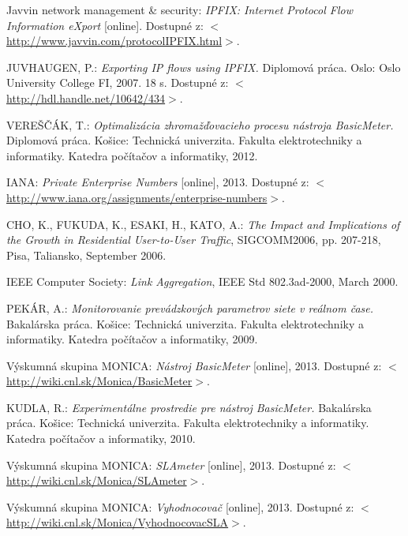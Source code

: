 \begin{thebibliography}{999}
Javvin network management \& security: \emph{IPFIX: Internet Protocol Flow Information eXport} [online]. Dostupné 
z: $<$\url{http://www.javvin.com/protocolIPFIX.html}$>$.

JUVHAUGEN, P.: \emph{Exporting IP flows using IPFIX.} 
Diplomová práca. Oslo: Oslo University College FI, 2007. 18 s. Dostupné 
z: $<$\url{http://hdl.handle.net/10642/434}$>$.

VEREŠČÁK, T.: \emph{Optimalizácia zhromažďovacieho procesu nástroja BasicMeter.} 
Diplomová práca. Košice: Technická univerzita. Fakulta elektrotechniky a informatiky. 
Katedra počítačov a informatiky, 2012.

IANA: \emph{Private Enterprise Numbers} [online], 2013. Dostupné 
z: $<$\url{http://www.iana.org/assignments/enterprise-numbers}$>$.

CHO, K., FUKUDA, K., ESAKI, H., KATO, A.: \emph{The Impact and Implications of the Growth in Residential
User-to-User Traffic}, SIGCOMM2006, pp. 207-218, Pisa, Taliansko, September 2006.

IEEE Computer Society: \emph{Link Aggregation}, IEEE Std 802.3ad-2000, March 2000.

PEKÁR, A.: \emph{Monitorovanie prevádzkových parametrov siete v reálnom čase.} 
Bakalárska práca. Košice: Technická univerzita. Fakulta elektrotechniky a informatiky. 
Katedra počítačov a informatiky, 2009.

Výskumná skupina MONICA: \emph{Nástroj BasicMeter} [online], 2013. 
Dostupné z: $<$\url{http://wiki.cnl.sk/Monica/BasicMeter}$>$.

KUDLA, R.: \emph{Experimentálne prostredie pre nástroj BasicMeter.} 
Bakalárska práca. Košice: Technická univerzita. Fakulta elektrotechniky a informatiky. 
Katedra počítačov a informatiky, 2010.

Výskumná skupina MONICA: \emph{SLAmeter} [online], 2013. 
Dostupné z: $<$\url{http://wiki.cnl.sk/Monica/SLAmeter}$>$.

Výskumná skupina MONICA: \emph{Vyhodnocovač} [online], 2013. 
Dostupné z: $<$\url{http://wiki.cnl.sk/Monica/VyhodnocovacSLA}$>$.


\end{thebibliography}
